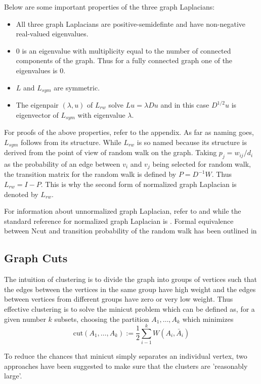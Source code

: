 \documentclass[10pt,a4paper, nocenter]{report}
\begin{document}
		Below are some important properties of the three graph Laplacians:
		\begin{itemize}
			\item All three graph Laplacians are positive-semidefinte and have non-negative real-valued eigenvalues.
			\item 0 is an eigenvalue with multiplicity equal to the number of connected components of the graph. Thus for a fully connected graph one of the eigenvalues is 0. \item $L$ and $L_{sym}$ are symmetric. 
			\item The eigenpair $(\lambda, u)$ of $L_{rw}$ solve $Lu=\lambda Du$ and in this case $D^{1/2}u$ is eigenvector of $L_{sym}$ with eigenvalue $\lambda$. 
        
    	\end{itemize}
    For proofs of the above properties, refer to the appendix. As far as naming goes, $L_{sym}$ follows from its structure. While $L_{rw}$ is so named because its structure is derived from the point of view of random walk on the graph. Taking $p_j = w_{ij}/d_i$ as the probability of an edge between $v_i$ and $v_j$ being selected for random walk, the transition matrix for the random walk is defined by $P = D^{-1}W$. Thus $L_{rw} = I-P$. This is why the second form of normalized graph Laplacian is denoted by $L_{rw}$.
    
    For information about unnormalized graph Laplacian, refer to \cite{mohar-1991} and \cite{mohar-1997} while the standard reference for normalized graph Laplacian is \cite{graph-spectral-book}. Formal equivalence between Ncut and transition probability of the random walk has been outlined in \cite{Meila01arandom}

    \subsection{Graph Cuts}
        The intuition of clustering is to divide the graph into groups of vertices such that the edges between the vertices in the same group have high weight and the edges between vertices from different groups have zero or very low weight. Thus effective clustering is to solve the minicut problem which can be defined as, for a given number $k$ subsets, choosing the partition $A_{1}, \dots, A_{k}$ which minimizes $$ \text{cut}(A_{1}, \dots, A_{k}) := \frac{1}{2}\sum_{i-1}^{k}W(A_i,\bar{A}_{i}) $$

        To reduce the chances that minicut simply separates an individual vertex, two approaches have been suggested to make sure that the clusters are 'reasonably large'. 
\end{document}
